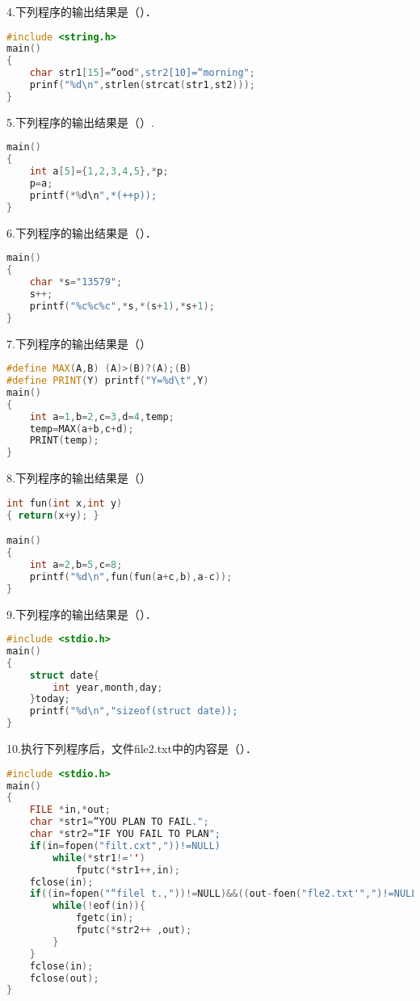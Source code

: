 4.下列程序的输出结果是（）．
\begin{lstlisting}[language=cpp]
#include <string.h>
main()
{
    char str1[15]=“ood",str2[10]=“morning";
    prinf("%d\n",strlen(strcat(str1,st2)));
}
\end{lstlisting}

5.下列程序的输出结果是（）.
\begin{lstlisting}[language=cpp]
main()
{
    int a[5]={1,2,3,4,5},*p;
    p=a;
    printf(*%d\n",*(++p));
}
\end{lstlisting}

6.下列程序的输出结果是（）．
\begin{lstlisting}[language=cpp]
main()
{
    char *s="13579";
    s++;
    printf("%c%c%c",*s,*(s+1),*s+1);
}
\end{lstlisting}

7.下列程序的输出结果是（）
\begin{lstlisting}[language=cpp]
#define MAX(A,B) (A)>(B)?(A);(B)
#define PRINT(Y) printf("Y=%d\t",Y)
main()
{
    int a=1,b=2,c=3,d=4,temp;
    temp=MAX(a+b,c+d);
    PRINT(temp);
}
\end{lstlisting}

8.下列程序的输出结果是（）
\begin{lstlisting}[language=cpp]
int fun(int x,int y)
{ return(x+y); }

main()
{
    int a=2,b=5,c=8;
    printf("%d\n",fun(fun(a+c,b),a-c));
}
\end{lstlisting}

9.下列程序的输出结果是（）．
\begin{lstlisting}[language=cpp]
#include <stdio.h>
main()
{
    struct date{
        int year,month,day;
    }today;
    printf("%d\n","sizeof(struct date));
}
\end{lstlisting}

10.执行下列程序后，文件file2.txt中的内容是（）．
\begin{lstlisting}[language=cpp]
#include <stdio.h>
main()
{
    FILE *in,*out;
    char *str1=“YOU PLAN TO FAIL.";
    char *str2=“IF YOU FAIL TO PLAN";
    if(in=fopen("filt.cxt","))!=NULL)
        while(*str1!='')
            fputc(*str1++,in);
    fclose(in);
    if((in=fopen("“filel t.,"))!=NULL)&&((out-foen("fle2.txt'",")!=NULL){
        while(!eof(in)){
            fgetc(in);
            fputc(*str2++ ,out);
        }
    }
    fclose(in);
    fclose(out);
}
\end{lstlisting}